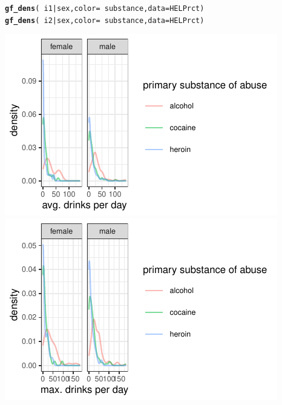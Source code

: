 \documentclass[twoside]{book}\usepackage[]{graphicx}\usepackage[]{xcolor}
\makeatletter
\def\maxwidth{ %
  \ifdim\Gin@nat@width>\linewidth
    \linewidth
  \else
    \Gin@nat@width
  \fi
}
\newcommand{\hlopt}[1]{\textcolor[rgb]{0,0,0}{#1}}%
\newcommand{\hlstd}[1]{\textcolor[rgb]{0.345,0.345,0.345}{#1}}%
\newcommand{\hlkwc}[1]{\textcolor[rgb]{0.333,0.667,0.333}{#1}}%
\newcommand{\hlkwd}[1]{\textcolor[rgb]{0.737,0.353,0.396}{\textbf{#1}}}%
\newenvironment{kframe}{%
 \def\at@end@of@kframe{}%
 \ifinner\ifhmode%
  \def\at@end@of@kframe{\end{minipage}}%
  \begin{minipage}{\columnwidth}%
 \fi\fi%
 \def\FrameCommand##1{\hskip\@totalleftmargin \hskip-\fboxsep
 \colorbox{shadecolor}{##1}\hskip-\fboxsep
     \hskip-\linewidth \hskip-\@totalleftmargin \hskip\columnwidth}%
 \MakeFramed {\advance\hsize-\width
   \@totalleftmargin\z@ \linewidth\hsize
   \@setminipage}}%
 {\par\unskip\endMakeFramed%
 \at@end@of@kframe}
\newenvironment{knitrout}{}{} %
\makeatother
\begin{document}
\begin{solution}
\begin{knitrout}
{}



\end{knitrout}
\begin{knitrout}
\color{fgcolor}\begin{kframe}
\begin{alltt}
\hlkwd{gf_dens}\hlstd{(} \hlopt{~}\hlstd{i1} \hlopt{|} \hlstd{sex,} \hlkwc{color} \hlstd{=} \hlopt{~} \hlstd{substance,} \hlkwc{data} \hlstd{= HELPrct )}
\hlkwd{gf_dens}\hlstd{(} \hlopt{~}\hlstd{i2} \hlopt{|} \hlstd{sex,} \hlkwc{color} \hlstd{=} \hlopt{~} \hlstd{substance,} \hlkwc{data} \hlstd{= HELPrct )}
\end{alltt}
\end{kframe}

{\centering \includegraphics[width=\maxwidth]{figures/fig-unnamed-chunk-28-1} 
\includegraphics[width=\maxwidth]{figures/fig-unnamed-chunk-28-2} 

}




\end{knitrout}
\end{solution}
\end{document}
